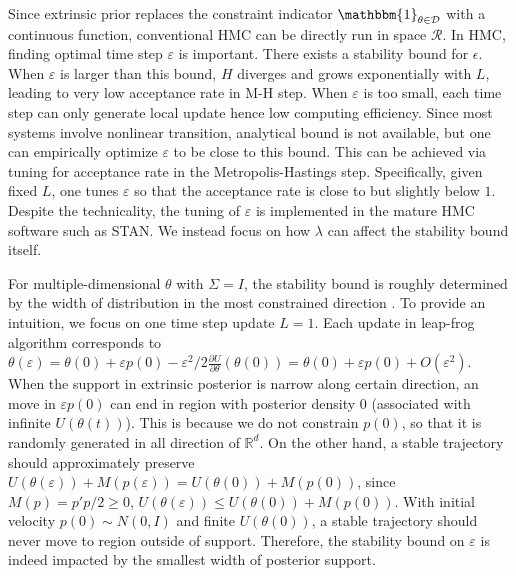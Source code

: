 \documentclass[10pt]{article}
\newcommand{\mc}[1]{\mathcal{#1}}
\DeclareMathOperator{\1}{\mathbbm{1}}
\begin{document}
 
Since extrinsic prior replaces the constraint indicator $\mathbbm{1}_{\theta \in \mc D}$ with a continuous function, conventional HMC can be directly run in space $\mc R$. In HMC, finding optimal time step $\varepsilon$ is important. There exists a stability bound for $\epsilon$. When $\varepsilon$ is larger than this bound, $H$ diverges and grows exponentially with $L$, leading to very low acceptance rate in M-H step. When $\varepsilon$ is too small, each time step can only generate local update hence low computing efficiency. 
Since most systems involve nonlinear transition, analytical bound is not available, but one can empirically optimize $\varepsilon$ to be close to this bound. This can be achieved via tuning for acceptance rate in the Metropolis-Hastings step. Specifically, given fixed $L$, one tunes $\varepsilon$ so that the acceptance rate is close to but slightly below $1$. Despite the technicality, the tuning of $\varepsilon$ is implemented in the mature HMC software such as STAN. We instead focus on how $\lambda$ can affect the stability bound itself.

For multiple-dimensional $\theta$ with $\Sigma=I$, the stability bound is roughly determined by the width of distribution in the most constrained direction  \citep{neal2011mcmc}. To provide an intuition, we focus on one  time step update $L=1$. Each update in leap-frog algorithm corresponds to $\theta(\varepsilon)=\theta(0) + \varepsilon  p(0) - \varepsilon^2/2  \frac{\partial U}{\partial  \theta } ( \theta (0)) = \theta(0) + \varepsilon  p(0) + O(\varepsilon^2)$. When the support in extrinsic posterior is narrow along certain direction, an move in $\varepsilon  p(0)$ can end in region with posterior density $0$ (associated with infinite $U(\theta(t))$). This is because we do not constrain $p(0)$, so that it is randomly generated in all direction of $\mathbb R^d$. On the other hand, a stable trajectory should approximately preserve $U(\theta(\varepsilon))+M(p(\varepsilon)) = U(\theta(0))+M(p(0))$, since $M(p)= p'p/2 \ge 0$, $U(\theta(\varepsilon))\le  U(\theta(0))+M(p(0))$. With initial velocity $p(0)\sim N(0, I)$ and finite $U(\theta(0))$, a stable trajectory should never move to region outside of support. Therefore, the stability bound on $\varepsilon$ is indeed impacted by the smallest width of posterior support.
\end{document}
